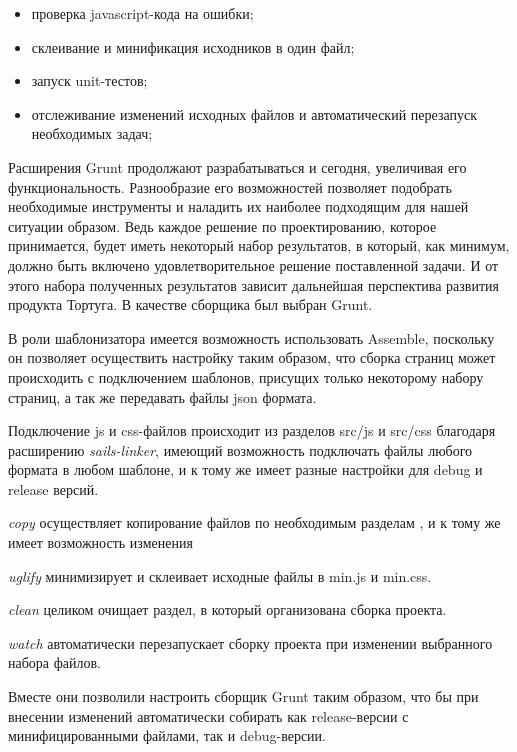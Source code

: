 \begin{itemize}
  \item проверка javascript-кода на ошибки;
  \item склеивание и минификация исходников в один файл;
  \item запуск unit-тестов;
  \item отслеживание изменений исходных файлов и автоматический перезапуск необходимых задач;
\end{itemize}


Расширения Grunt продолжают разрабатываться и сегодня, увеличивая его функциональность. Разнообразие его возможностей позволяет подобрать необходимые инструменты и наладить их наиболее подходящим для нашей ситуации образом. Ведь каждое решение по проектированию, которое принимается, будет иметь некоторый набор результатов, в который, как минимум, должно быть включено удовлетворительное решение поставленной задачи. И от этого набора полученных результатов зависит дальнейшая перспектива развития продукта Тортуга. В качестве сборщика был выбран Grunt.

В роли шаблонизатора имеется возможность использовать Assemble, поскольку он позволяет осуществить настройку  таким образом, что сборка страниц может происходить с подключением шаблонов, присущих только некоторому набору страниц, а так же передавать файлы json формата.

Подключение js и css-файлов происходит из разделов src/js и src/css благодаря расширению \textit{sails-linker}, имеющий возможность подключать файлы любого формата в любом шаблоне, и к тому же имеет разные настройки для debug и release версий.

\textit{copy} осуществляет копирование файлов по необходимым разделам , и к тому же имеет возможность изменения 

\textit{uglify} минимизирует и склеивает исходные файлы в min.js и min.css.

\textit{clean} целиком очищает раздел, в который организована сборка проекта.

\textit{watch} автоматически перезапускает сборку проекта при изменении выбранного набора файлов.


Вместе они позволили настроить сборщик Grunt таким образом, что бы при внесении изменений автоматически собирать как release-версии с минифицированными файлами, так и debug-версии.


